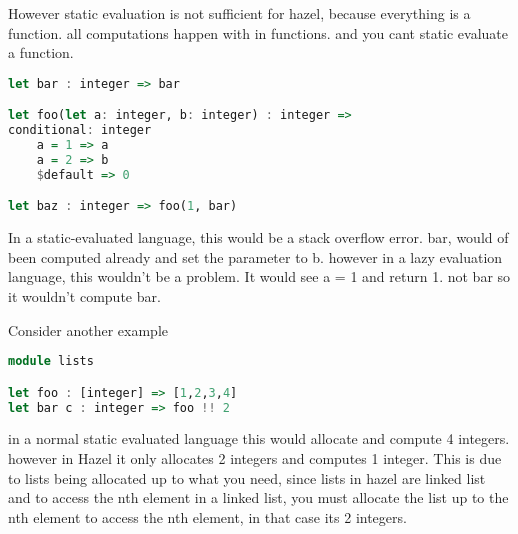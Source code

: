 \documentclass{article}
\begin{document}
However static evaluation is not sufficient for hazel, because everything is a function. all computations happen with in functions. and you cant static evaluate a function. 

\begin{lstlisting}[language=Haskell, caption=consider these 2 functions. bar a recursive function and foo that takes parameters a and b and compares a results]
let bar : integer => bar

let foo(let a: integer, b: integer) : integer => 
conditional: integer 
    a = 1 => a
    a = 2 => b
    $default => 0

let baz : integer => foo(1, bar)

\end{lstlisting}

In a static-evaluated language, this would be a stack overflow error. bar, would of been computed already and set the parameter to b. however in a lazy evaluation language, this wouldn't be a problem. It would see a = 1 and return 1. not bar so it wouldn't compute bar. 

Consider another example 


\begin{lstlisting}[language=Haskell, caption=consider a function that returns a list and your indexing the list]
module lists

let foo : [integer] => [1,2,3,4]
let bar c : integer => foo !! 2

\end{lstlisting}

in a normal static evaluated language this would allocate and compute 4 integers. however in Hazel it only allocates 2 integers and computes 1 integer. This is due to lists being allocated up to what you need, since lists in hazel are linked list and to access the nth element in a linked list, you must allocate the list up to the nth element to access the nth element, in that case its 2 integers. 
\end{document}
